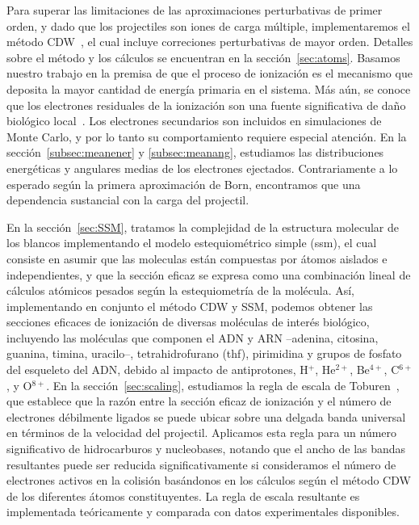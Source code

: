 Para superar las limitaciones de las aproximaciones perturbativas de 
primer orden, y dado que los projectiles son iones de carga múltiple, 
implementaremos el método 
CDW~\cite{galassi2000,fainstein1988,miraglia2008,miraglia2009}, el 
cual incluye correciones perturbativas de mayor orden. Detalles sobre 
el método y los cálculos se encuentran en la sección~\ref{sec:atoms}.
Basamos nuestro trabajo en la premisa de que el proceso de ionización 
es el mecanismo que deposita la mayor cantidad de energía primaria en el
sistema. Más aún, se conoce que los electrones residuales de la ionización
son una fuente significativa de daño biológico local~\cite{Denifl2011}. 
Los electrones secundarios son incluidos en simulaciones de Monte Carlo,
y por lo tanto su comportamiento requiere especial atención.
En la sección~\ref{subsec:meanener} y \ref{subsec:meanang}, estudiamos
las distribuciones energéticas y angulares medias de los electrones 
ejectados. Contrariamente a lo esperado según la primera aproximación 
de Born, encontramos que una dependencia sustancial con la carga del 
projectil. 

En la sección~\ref{sec:SSM}, tratamos la complejidad de la estructura 
molecular de los blancos implementando el modelo estequiométrico simple 
(\acs{ssm}), el cual consiste en asumir que las moleculas están 
compuestas por átomos aislados e independientes, y que la sección eficaz 
se expresa como una combinación lineal de cálculos atómicos pesados según 
la estequiometría de la molécula. Así, implementando en conjunto el 
método CDW y SSM, podemos obtener las secciones eficaces de ionización de 
diversas moléculas de interés biológico, incluyendo las moléculas que 
componen el ADN y ARN --adenina, citosina, guanina, timina, uracilo--, 
tetrahidrofurano (\acs{thf}), pirimidina y grupos de fosfato del 
esqueleto del ADN, debido al impacto de antiprotones, H$^{+}$, He$^{2+}$, 
Be$^{4+}$, C$^{6+}$, y O$^{8+}$. 
En la sección~\ref{sec:scaling}, estudiamos la regla de escala de 
Toburen~\cite{toburen1975,toburen1976}, que establece que la razón entre
la sección eficaz de ionización y el número de electrones débilmente
ligados se puede ubicar sobre una delgada banda universal en términos 
de la velocidad del projectil. Aplicamos esta regla para un número 
significativo de hidrocarburos y nucleobases, notando que el ancho de las
bandas resultantes puede ser reducida significativamente si consideramos
el número de electrones activos en la colisión basándonos en los 
cálculos según el método CDW de los diferentes átomos constituyentes. 
La regla de escala resultante es implementada teóricamente y comparada 
con datos experimentales disponibles.

